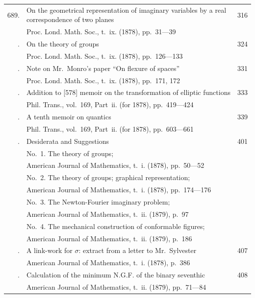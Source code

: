 \documentclass[11pt,a4paper]{book}
\begin{document}
\begin{longtable}{rp{4.5in}r}
689. & On the geometrical representation of imaginary variables by a real correspondence of two planes & 316 \\
    & \quad Proc. Lond. Math. Soc., t.~ix. (1878), pp.~31---39 & \\
\addlinespace
690. & On the theory of groups & 324 \\
    & \quad Proc. Lond. Math. Soc., t.~ix. (1878), pp.~126---133 & \\
\addlinespace
691. & Note on Mr.~Monro's paper ``On flexure of spaces'' & 331 \\
    & \quad Proc. Lond. Math. Soc., t.~ix. (1878), pp.~171, 172 & \\
\addlinespace
692. & Addition to [578] memoir on the transformation of elliptic functions & 333 \\
    & \quad Phil. Trans., vol.~169, Part~ii. (for 1878), pp.~419---424 & \\
\addlinespace
693. & A tenth memoir on quantics & 339 \\
    & \quad Phil. Trans., vol.~169, Part~ii. (for 1878), pp.~603---661 & \\
\addlinespace
694. & Desiderata and Suggestions & 401 \\
    & \quad No.~1. The theory of groups; & \\
    & \quad \quad American Journal of Mathematics, t.~i. (1878), pp.~50---52 & \\
    & \quad No.~2. The theory of groups; graphical representation; & \\
    & \quad \quad American Journal of Mathematics, t.~i. (1878), pp.~174---176 & \\
    & \quad No.~3. The Newton-Fourier imaginary problem; & \\
    & \quad \quad American Journal of Mathematics, t.~ii. (1879), p.~97 & \\
    & \quad No.~4. The mechanical construction of conformable figures; & \\
    & \quad \quad American Journal of Mathematics, t.~ii. (1879), p.~186 & \\
\addlinespace
695. & A link-work for $\sigma$: extract from a letter to Mr.~Sylvester & 407 \\
    & \quad American Journal of Mathematics, t.~i. (1878), p.~386 & \\
\addlinespace
696. & Calculation of the minimum N.G.F. of the binary seventhic & 408 \\
    & \quad American Journal of Mathematics, t.~ii. (1879), pp.~71---84 & \\

\end{longtable}
\end{document}

